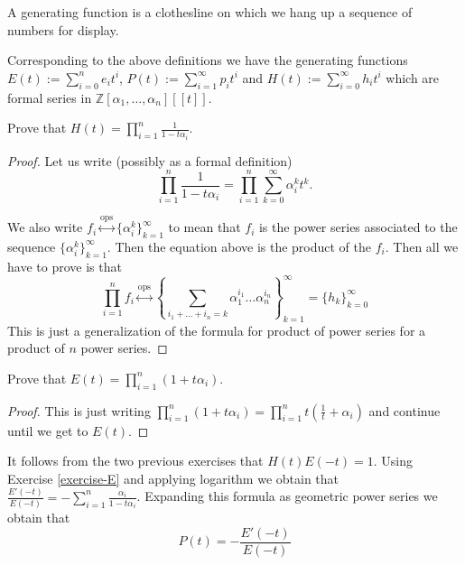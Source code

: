 \begin{slogan}
\begin{reference}
\cite[p. 1]{generatingfunctionology}
\end{reference}
A generating function is a clothesline on which we hang up a sequence of numbers
for display.
\end{slogan}

Corresponding to the above definitions we have the generating functions 
$E(t):=\sum_{i=0}^ne_it^i$, $P(t):=\sum_{i=1}^\infty p_it^i$ and 
$H(t):=\sum_{i=0}^\infty h_it^i$ which are formal series in 
$\mathbb{Z}[\alpha_1,\ldots,\alpha_n][\![t]\!]$.

\begin{exercise}
\label{exercise-H}
Prove that $H(t)=\prod_{i=1}^n\frac{1}{1-t\alpha_i}$.
\end{exercise}

\begin{proof}
Let us write (possibly as a formal definition)
$$
\prod_{i=1}^n\frac{1}{1-t\alpha_i}=\prod_{i=1}^n\sum_{k=0}^\infty\alpha_i^kt^k.
$$

We also write 
$f_i\overset{\text{ops}}{\longleftrightarrow}\{\alpha_i^k\}_{k=1}^\infty$ to mean
that $f_i$ is the power series associated to the sequence
$\{\alpha_i^k\}_{k=1}^\infty$. Then the equation above is the product of the
$f_i$. Then all we have to prove is that
$$
\prod_{i=1}^nf_i\overset{\text{ops}}{\longleftrightarrow}
\left\{\sum_{i_1+\ldots+i_n=k}\alpha_1^{i_1}\ldots\alpha_n^{i_n}\right\}
_{k=1}^\infty=\{h_k\}_{k=0}^\infty
$$
This is just a generalization of the formula for product of power series for a
product of $n$ power series.
\end{proof}

\begin{exercise}
\label{exercise-E}
Prove that $E(t)=\prod_{i=1}^n(1+t\alpha_i)$.
\end{exercise}

\begin{proof}
This is just writing $\prod_{i=1}^n(1+t\alpha_i)
=\prod_{i=1}^nt(\frac{1}{t}+\alpha_i)$ and continue until we get to $E(t)$.
\end{proof}

It follows from the two previous exercises that $H(t)E(-t)=1$. Using Exercise
\ref{exercise-E} and applying logarithm we obtain that
$\frac{E'(-t)}{E(-t)}=-\sum_{i=1}^n \frac{\alpha_i}{1-t\alpha_i}$. Expanding
this formula as geometric power series we obtain that 
\begin{equation}
\label{equation-P-in-terms-of-E}
P(t)=-\frac{E'(-t)}{E(-t)}
\end{equation}

